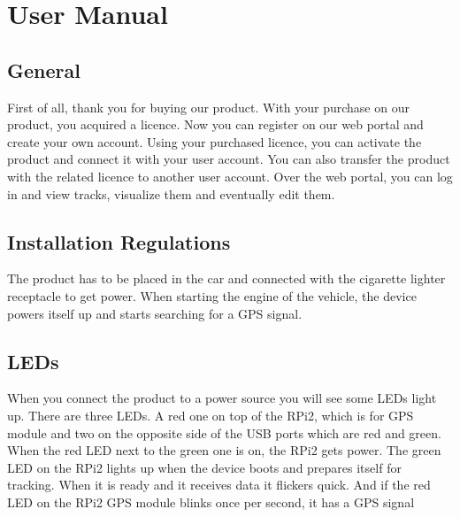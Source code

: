\chapter{User Manual}
\section{General}
First of all, thank you for buying our product. With your purchase on our product, you acquired a licence. Now you can register on our web portal and create your own account. Using your purchased licence, you can activate the product and connect it with your user account. You can also transfer the product with the related licence to another user account. Over the web portal, you can log in and view tracks, visualize them and eventually edit them.
\section{Installation Regulations}
The product has to be placed in the car and connected with the cigarette lighter receptacle to get power. When starting the engine of the vehicle, the device powers itself up and starts searching for a GPS signal.
\section{LEDs}
When you connect the product to a power source you will see some LEDs light up.
There are three LEDs. A red one on top of the RPi2, which is for GPS module and two on the opposite side of the USB ports which are red and green.
When the red LED next to the green one is on, the RPi2 gets power.
The green LED on the RPi2 lights up when the device boots and prepares itself for tracking. When it is ready and it receives data it flickers quick.
And if the red LED on the RPi2 GPS module blinks once per second, it has a GPS signal

